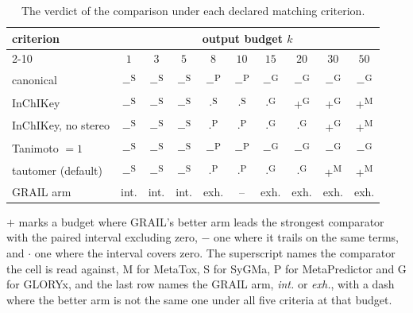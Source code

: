 \begin{table}[t]
\centering\small
\begin{threeparttable}
\caption{The verdict of the comparison under each declared matching criterion.}
\label{tab:criterion}
\begin{tabular}{lccccccccc}
\toprule
criterion & \multicolumn{9}{c}{output budget $k$} \\
\cmidrule(lr){2-10}
 & $1$ & $3$ & $5$ & $8$ & $10$ & $15$ & $20$ & $30$ & $50$ \\
\midrule
canonical & $-$\textsuperscript{S} & $-$\textsuperscript{S} & $-$\textsuperscript{S} & $-$\textsuperscript{P} & $-$\textsuperscript{P} & $-$\textsuperscript{G} & $-$\textsuperscript{G} & $-$\textsuperscript{G} & $-$\textsuperscript{G} \\
InChIKey & $-$\textsuperscript{S} & $-$\textsuperscript{S} & $-$\textsuperscript{S} & $\cdot$\textsuperscript{S} & $\cdot$\textsuperscript{S} & $\cdot$\textsuperscript{G} & $+$\textsuperscript{G} & $+$\textsuperscript{G} & $+$\textsuperscript{M} \\
InChIKey, no stereo & $-$\textsuperscript{S} & $-$\textsuperscript{S} & $-$\textsuperscript{S} & $\cdot$\textsuperscript{P} & $\cdot$\textsuperscript{P} & $\cdot$\textsuperscript{G} & $\cdot$\textsuperscript{G} & $+$\textsuperscript{G} & $+$\textsuperscript{M} \\
Tanimoto $=1$ & $-$\textsuperscript{S} & $-$\textsuperscript{S} & $-$\textsuperscript{S} & $-$\textsuperscript{P} & $-$\textsuperscript{P} & $-$\textsuperscript{G} & $-$\textsuperscript{G} & $-$\textsuperscript{G} & $-$\textsuperscript{G} \\
tautomer (default) & $-$\textsuperscript{S} & $-$\textsuperscript{S} & $-$\textsuperscript{S} & $\cdot$\textsuperscript{P} & $\cdot$\textsuperscript{P} & $\cdot$\textsuperscript{G} & $\cdot$\textsuperscript{G} & $+$\textsuperscript{M} & $+$\textsuperscript{M} \\
\midrule
GRAIL arm & int. & int. & int. & exh. & -- & exh. & exh. & exh. & exh. \\
\bottomrule
\end{tabular}
\begin{tablenotes}[flushleft]\footnotesize
\item $+$ marks a budget where GRAIL's better arm leads the strongest comparator with the paired interval excluding zero, $-$ one where it trails on the same terms, and $\cdot$ one where the interval covers zero. The superscript names the comparator the cell is read against, M for MetaTox, S for SyGMa, P for MetaPredictor and G for GLORYx, and the last row names the GRAIL arm, \emph{int.} or \emph{exh.}, with a dash where the better arm is not the same one under all five criteria at that budget.
\end{tablenotes}
\end{threeparttable}
\end{table}
